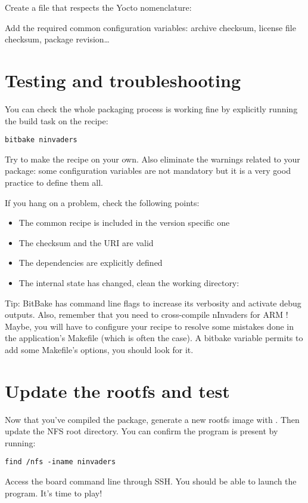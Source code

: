 Create a file that respects the Yocto nomenclature: 

Add the required common configuration variables: archive checksum, license file
checksum, package revision\dots

\section{Testing and troubleshooting}

You can check the whole packaging process is working fine by explicitly running
the build task on the  recipe:
\begin{verbatim}
bitbake ninvaders
\end{verbatim}

Try to make the recipe on your own. Also eliminate the warnings related to your
package: some configuration variables are not mandatory but it is a very good
practice to define them all.

If you hang on a problem, check the following points:
\begin{itemize}
  \item The common recipe is included in the version specific one
  \item The checksum and the URI are valid
  \item The dependencies are explicitly defined
  \item The internal state has changed, clean the working directory: \\
\end{itemize}

Tip: BitBake has command line flags to increase its verbosity and activate debug
outputs. Also, remember that you need to cross-compile nInvaders for ARM ! Maybe,
you will have to configure your recipe to resolve some mistakes done in the
application's Makefile (which is often the case). A bitbake variable permits
to add some Makefile's options, you should look for it.

\section{Update the rootfs and test}

Now that you've compiled the  package, generate a new
rootfs image with . Then update the
NFS root directory. You can confirm the  program is
present by running:
\begin{verbatim}
find /nfs -iname ninvaders
\end{verbatim}

Access the board command line through SSH. You should be able to
launch the  program. It's time to play!
